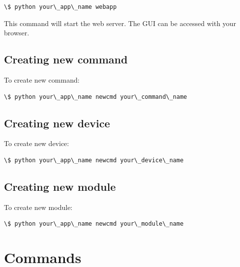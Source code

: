 \documentclass[letterpaper,10pt,english]{sphinxmanual}
\begin{document}
\begin{Verbatim}[commandchars=\\\{\}]
\$ python your\_app\_name webapp
\end{Verbatim}

This command will start the web server. The GUI can be accessed with your browser.


\section{Creating new command}
\label{tutorial:creating-new-command}
To create new command:

\begin{Verbatim}[commandchars=\\\{\}]
\$ python your\_app\_name newcmd your\_command\_name
\end{Verbatim}


\section{Creating new device}
\label{tutorial:creating-new-device}
To create new device:

\begin{Verbatim}[commandchars=\\\{\}]
\$ python your\_app\_name newcmd your\_device\_name
\end{Verbatim}


\section{Creating new module}
\label{tutorial:creating-new-module}
To create new module:

\begin{Verbatim}[commandchars=\\\{\}]
\$ python your\_app\_name newcmd your\_module\_name
\end{Verbatim}


\chapter{Commands}
\label{command:module-pyfrid.core.command}\label{command:commands}\label{command::doc}
\end{document}

